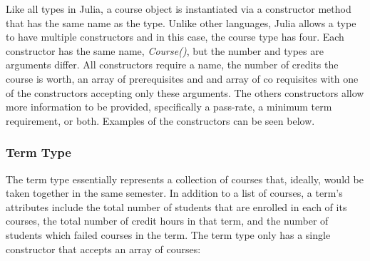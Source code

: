 \documentclass[botnum, fleqn]{unmeethesis}
\begin{document}

        Like all types in Julia, a course object is instantiated via a constructor method that has the same name as the type. Unlike other languages, Julia allows a type to have multiple constructors and in this case, the course type has four. Each constructor has the same name, \textit{Course()}, but the number and types are arguments differ. All constructors require a name, the number of credits the course is worth, an array of prerequisites and and array of co requisites with one of the constructors accepting only these arguments. The others constructors allow more information to be provided, specifically a pass-rate, a minimum term requirement, or both. Examples of the constructors can be seen below.

        

      \subsubsection{Term Type}
        The term type essentially represents a collection of courses that, ideally, would be taken together in the same semester. In addition to a list of courses, a term's attributes include the total number of students that are enrolled in each of its courses, the total number of credit hours in that term, and the number of students which failed courses in the term. The term type only has a single constructor that accepts an array of courses:


\end{document}
